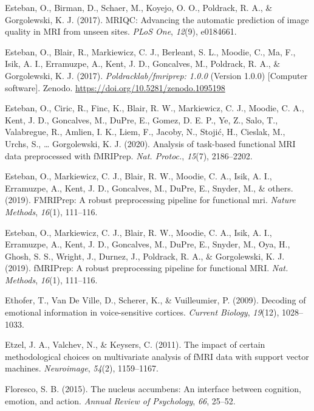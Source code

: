 \documentclass[11pt,american,]{memoir} %
\begin{document}
\leavevmode\hypertarget{ref-Esteban2017-mv}{}%
Esteban, O., Birman, D., Schaer, M., Koyejo, O. O., Poldrack, R. A., \& Gorgolewski, K. J. (2017). MRIQC: Advancing the automatic prediction of image quality in MRI from unseen sites. \emph{PLoS One}, \emph{12}(9), e0184661.

\leavevmode\hypertarget{ref-esteban_oscar_2017_1095198}{}%
Esteban, O., Blair, R., Markiewicz, C. J., Berleant, S. L., Moodie, C., Ma, F., Isik, A. I., Erramuzpe, A., Kent, J. D., Goncalves, M., Poldrack, R. A., \& Gorgolewski, K. J. (2017). \emph{Poldracklab/fmriprep: 1.0.0} (Version 1.0.0) {[}Computer software{]}. Zenodo. \url{https://doi.org/10.5281/zenodo.1095198}

\leavevmode\hypertarget{ref-Esteban2020-qw}{}%
Esteban, O., Ciric, R., Finc, K., Blair, R. W., Markiewicz, C. J., Moodie, C. A., Kent, J. D., Goncalves, M., DuPre, E., Gomez, D. E. P., Ye, Z., Salo, T., Valabregue, R., Amlien, I. K., Liem, F., Jacoby, N., Stojić, H., Cieslak, M., Urchs, S., \ldots{} Gorgolewski, K. J. (2020). Analysis of task-based functional MRI data preprocessed with fMRIPrep. \emph{Nat. Protoc.}, \emph{15}(7), 2186--2202.

\leavevmode\hypertarget{ref-esteban2019fmriprep}{}%
Esteban, O., Markiewicz, C. J., Blair, R. W., Moodie, C. A., Isik, A. I., Erramuzpe, A., Kent, J. D., Goncalves, M., DuPre, E., Snyder, M., \& others. (2019). FMRIPrep: A robust preprocessing pipeline for functional mri. \emph{Nature Methods}, \emph{16}(1), 111--116.

\leavevmode\hypertarget{ref-Esteban2019-ri}{}%
Esteban, O., Markiewicz, C. J., Blair, R. W., Moodie, C. A., Isik, A. I., Erramuzpe, A., Kent, J. D., Goncalves, M., DuPre, E., Snyder, M., Oya, H., Ghosh, S. S., Wright, J., Durnez, J., Poldrack, R. A., \& Gorgolewski, K. J. (2019). fMRIPrep: A robust preprocessing pipeline for functional MRI. \emph{Nat. Methods}, \emph{16}(1), 111--116.

\leavevmode\hypertarget{ref-ethofer2009decoding}{}%
Ethofer, T., Van De Ville, D., Scherer, K., \& Vuilleumier, P. (2009). Decoding of emotional information in voice-sensitive cortices. \emph{Current Biology}, \emph{19}(12), 1028--1033.

\leavevmode\hypertarget{ref-etzel2011impact}{}%
Etzel, J. A., Valchev, N., \& Keysers, C. (2011). The impact of certain methodological choices on multivariate analysis of fMRI data with support vector machines. \emph{Neuroimage}, \emph{54}(2), 1159--1167.

\leavevmode\hypertarget{ref-floresco2015nucleus}{}%
Floresco, S. B. (2015). The nucleus accumbens: An interface between cognition, emotion, and action. \emph{Annual Review of Psychology}, \emph{66}, 25--52.
\end{document}
